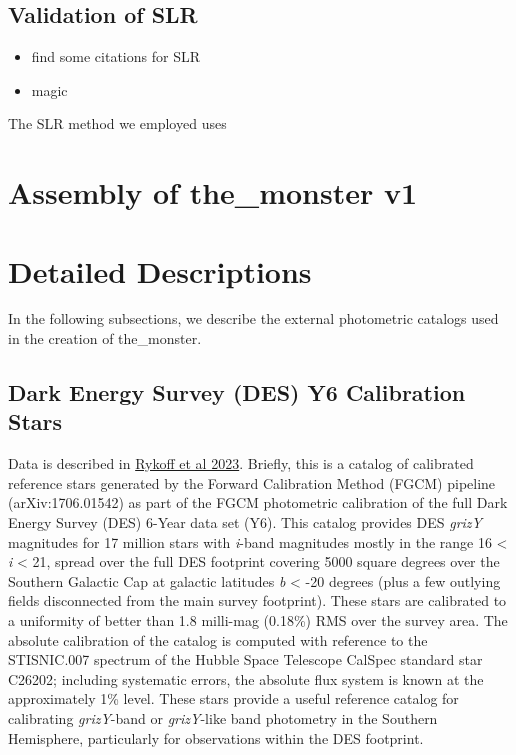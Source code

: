 \subsection{Validation of SLR}

\begin{itemize}
    \item find some citations for SLR
    \item magic 
\end{itemize}
The SLR method we employed uses 

\section{Assembly of the\_monster v1}
\label{sec:assembly}



\section{Detailed Descriptions}
\label{sec:details}
In the following subsections, we describe the external photometric catalogs used in the creation of the\_monster.

\subsection{Dark Energy Survey (DES) Y6 Calibration Stars}
\label{sec:des}
Data is described in \href{https://arxiv.org/abs/2305.01695}{Rykoff et al 2023}.
Briefly, this is a catalog of calibrated reference stars generated by the Forward Calibration Method (FGCM) pipeline (arXiv:1706.01542) as part of the FGCM photometric calibration of the full Dark Energy Survey (DES) 6-Year data set (Y6). This catalog provides DES \textit{grizY} magnitudes for 17 million stars with \textit{i}-band magnitudes mostly in the range 16 < \textit{i} < 21, spread over the full DES footprint covering 5000 square degrees over the Southern Galactic Cap at galactic latitudes \textit{b} < -20 degrees (plus a few outlying fields disconnected from the main survey footprint). 
These stars are calibrated to a uniformity of better than 1.8 milli-mag (0.18\%) RMS over the survey area. 
The absolute calibration of the catalog is computed with reference to the STISNIC.007 spectrum of the Hubble Space Telescope CalSpec standard star C26202; including systematic errors, the absolute flux system is known at the approximately 1\% level. 
These stars provide a useful reference catalog for calibrating \textit{grizY}-band or \textit{grizY}-like band photometry in the Southern Hemisphere, particularly for observations within the DES footprint.

